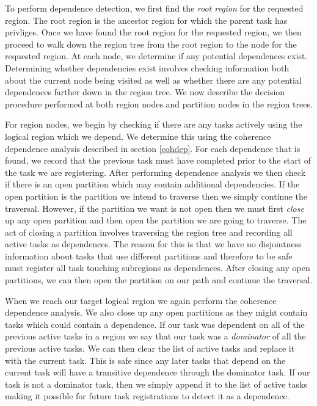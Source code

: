 To perform dependence detection, we first find the {\em root region} for the 
requested region.  The root region is the ancestor region for which the parent task
has privliges.  Once we have found the root region for the requested region, we then proceed to walk
down the region tree from the root region to the node
for the requested region.  At each node, we determine if any potential dependences exist.
Determining whether dependencies exist involves checking information both about the current
node being visited as well as whether there are any potential dependences farther down
in the region tree.  We now describe the decision procedure performed at both region
nodes and partition nodes in the region trees.

For region nodes, we begin by checking if there are any tasks actively using the logical
region which we depend.  We determine this using the coherence dependence analysis described 
in section \ref{cohdep}.  For each dependence that is found, we record that the previous
task must have completed prior to the start of the task we are registering.  After performing
dependence analysis we then check if there is an open partition which may contain additional
dependencies.  If the open partition is the partition we intend to traverse then we
simply continue the traversal.  However, if the partition we want is not open then we must
first {\em close} up any open partition and then open the partition we are going to
traverse.  The act of closing a partition involves traversing the region tree and recording
all active tasks as dependences.  The reason for this is that we have no disjointness
information about tasks that use different partitions and therefore to be safe must register
all task touching subregions as dependences.  After closing any open partitions, we
can then open the partition on our path and continue the traversal.

When we reach our target logical region we again perform the coherence dependence analysis.
We also close up any open partitions as they might contain tasks which could contain
a dependence.  If our task was dependent on all of the previous active tasks in a region
we say that our task was a {\em dominator} of all the previous active tasks.  We can
then clear the list of active tasks and replace it with the current task.  This is safe since
any later tasks that depend on the current task will have a transitive dependence 
through the dominator task.  If our task is not a dominator task, then we simply append
it to the list of active tasks making it possible for future task registrations to detect
it as a dependence.

